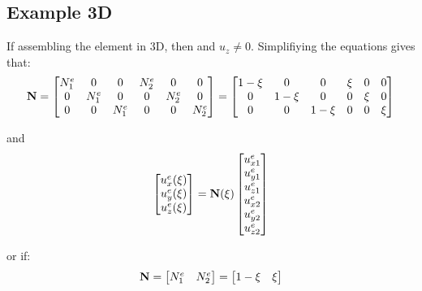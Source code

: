 \subsection{Example 3D}
If assembling the element in 3D, then and $ u_z \neq 0 $.
Simplifiying the equations gives that:
\begin{equation}
    \mathbf{N} = \begin{bmatrix}
        N_1^e & 0 & 0 & N_2^e & 0 & 0 \\
        0 & N_1^e & 0 & 0 & N_2^e & 0 \\
        0 & 0 & N_1^e & 0 & 0 & N_2^e \\
    \end{bmatrix}
    = \begin{bmatrix}
        1 - \xi & 0 & 0 & \xi & 0 & 0 \\
        0 & 1 - \xi & 0 & 0 & \xi & 0  \\
        0 & 0 & 1 - \xi & 0 & 0 & \xi \\
    \end{bmatrix}
\end{equation}

and
\begin{equation}
    \begin{bmatrix}
        u_x^e(\xi) \\
        u_y^e(\xi) \\
        u_z^e(\xi) \\
    \end{bmatrix}
    = \mathbf{N}(\xi) \begin{bmatrix}
        u_{x1}^e \\
        u_{y1}^e \\
        u_{z1}^e \\
        u_{x2}^e \\
        u_{y2}^e \\
        u_{z2}^e \\
    \end{bmatrix}
\end{equation}

or if:
\begin{equation}
    \mathbf{N} = \begin{bmatrix}
        N_1^e & N_2^e \\
    \end{bmatrix}
    = \begin{bmatrix}
        1 - \xi & \xi \\
    \end{bmatrix}
\end{equation}

